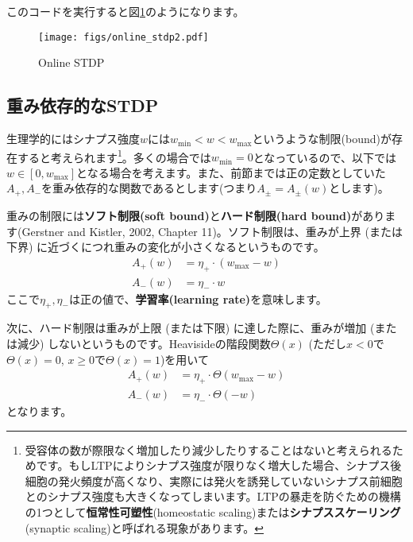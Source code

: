 このコードを実行すると図\ref{fig:online_stdp2}のようになります。
\begin{figure}[htbp]
    \centering
    \texttt{[image: figs/online\_stdp2.pdf]}
    \caption{Online STDP}
    \label{fig:online_stdp2}
\end{figure}

\subsection{重み依存的なSTDP}
生理学的にはシナプス強度$w$には$w_{\min} < w < w_{\max}$というような制限(bound)が存在すると考えられます\footnote{受容体の数が際限なく増加したり減少したりすることはないと考えられるためです。もしLTPによりシナプス強度が限りなく増大した場合、シナプス後細胞の発火頻度が高くなり、実際には発火を誘発していないシナプス前細胞とのシナプス強度も大きくなってしまいます。LTPの暴走を防ぐための機構の1つとして\textbf{恒常性可塑性}(homeostatic scaling)または\textbf{シナプススケーリング}(synaptic scaling)と呼ばれる現象があります。}。多くの場合では$w_{\min}=0$となっているので、以下では$w\in [0, w_{\max}]$となる場合を考えます。また、前節までは正の定数としていた$A_+, A_-$を重み依存的な関数であるとします(つまり$A_\pm=A_\pm(w)$とします)。\par
重みの制限には\textbf{ソフト制限(soft bound)}と\textbf{ハード制限(hard bound)}があります(Gerstner and Kistler, 2002, Chapter 11)。ソフト制限は、重みが上界 (または下界) に近づくにつれ重みの変化が小さくなるというものです。
\begin{align}
A_+(w) &= \eta_+\cdot (w_{\max}-w) \\
A_-(w) &= \eta_-\cdot w
\end{align}
ここで$\eta_+, \eta_-$は正の値で、\textbf{学習率(learning rate)}を意味します。\par
次に、ハード制限は重みが上限 (または下限) に達した際に、重みが増加 (または減少) しないというものです。Heavisideの階段関数$\Theta(x)$ (ただし$x<0$で$\Theta(x)=0$, $x\geq 0$で$\Theta(x)=1$)を用いて
\begin{align}
A_+(w) &= \eta_+\cdot \Theta(w_{\max}-w) \\
A_-(w) &= \eta_-\cdot \Theta(-w)
\end{align}
となります。
